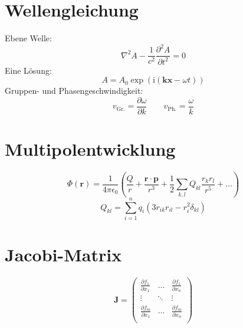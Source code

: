 \documentclass{scrartcl}
\begin{document}
\section{Wellengleichung}
Ebene Welle:
\begin{equation}
  \nabla^2 A - \frac{1}{c^2} \frac{\partial^2 A}{\partial t^2} = 0
\end{equation}
Eine Lösung:
\begin{equation}
  A = A_0 \exp(\mathrm{i} (\mathbf{k} \mathbf{x} - \omega t))
\end{equation}
Gruppen- und Phasengeschwindigkeit:
\begin{equation}
  v_\text{Gr.} = \frac{\partial \omega}{\partial k} \qquad v_\text{Ph.} = \frac{\omega}{k}
\end{equation}

\section{Multipolentwicklung}
\begin{equation}
  \Phi(\mathbf{r}) = \frac{1}{4\pi\epsilon_0}\left(\frac{Q}{r} +
  \frac{\mathbf{r} \cdot \mathbf{p}}{r^3} + \frac{1}{2} \sum_{k, l} Q_{kl} \frac{r_k r_l}{r^5} + \dots\right)
\end{equation}
\begin{equation*}
  Q_{kl} = \sum_{i = 1}^n q_i \left(3 r_{ik} r_{il} - r_i^2 \delta_{kl}\right)
\end{equation*}

\section{Jacobi-Matrix}
\begin{equation}
  \mathbf{J} =
  \begin{pmatrix}
    \frac{\partial f_1}{\partial x_1} & \dots  & \frac{\partial f_1}{\partial x_n} \\
    \vdots                            & \ddots & \vdots                            \\
    \frac{\partial f_m}{\partial x_1} & \dots  & \frac{\partial f_m}{\partial x_n} \\
  \end{pmatrix}
\end{equation}
\end{document}
